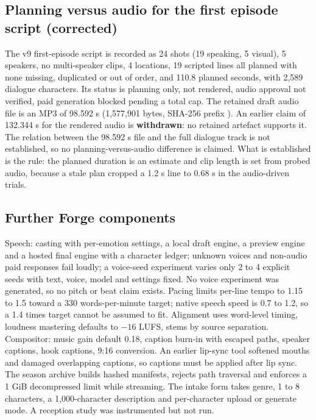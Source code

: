 \documentclass[11pt,a4paper]{article}
\newcommand{\code}[1]{\texttt{\detokenize{#1}}}
\begin{document}
\subsection{Planning versus audio for the first episode script (corrected)}
The v9 first-episode script is recorded as 24 shots (19 speaking, 5 visual), 5 speakers, no multi-speaker clips, 4 locations, 19 scripted lines all planned with none missing, duplicated or out of order, and 110.8 planned seconds, with 2,589 dialogue characters. Its status is planning only, not rendered, audio approval not verified, paid generation blocked pending a total cap. The retained draft audio file is an MP3 of 98.592 s (1,577,901 bytes, SHA-256 prefix \code{4c3d18ca}). An earlier claim of 132.344 s for the rendered audio is \textbf{withdrawn}: no retained artefact supports it. The relation between the 98.592 s file and the full dialogue track is not established, so no planning-versus-audio difference is claimed. What is established is the rule: the planned duration is an estimate and clip length is set from probed audio, because a stale plan cropped a 1.2 s line to 0.68 s in the audio-driven trials.

\subsection{Further Forge components}
Speech: casting with per-emotion settings, a local draft engine, a preview engine and a hosted final engine with a character ledger; unknown voices and non-audio paid responses fail loudly; a voice-seed experiment varies only 2 to 4 explicit seeds with text, voice, model and settings fixed. No voice experiment was generated, so no pitch or beat claim exists. Pacing limits per-line tempo to 1.15 to 1.5 toward a 330 words-per-minute target; native speech speed is 0.7 to 1.2, so a 1.4 times target cannot be assumed to fit. Alignment uses word-level timing, loudness mastering defaults to $-16$ LUFS, stems by source separation. Compositor: music gain default 0.18, caption burn-in with escaped paths, speaker captions, hook captions, 9:16 conversion. An earlier lip-sync tool softened mouths and damaged overlapping captions, so captions must be applied after lip sync. The season archive builds hashed manifests, rejects path traversal and enforces a 1 GiB decompressed limit while streaming. The intake form takes genre, 1 to 8 characters, a 1,000-character description and per-character upload or generate mode. A reception study was instrumented but not run.
\end{document}

